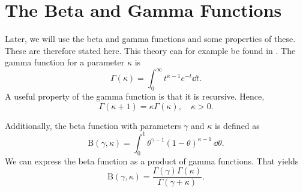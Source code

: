 \section{The Beta and Gamma Functions}


Later, we will use the beta and gamma functions and some properties of these. These are therefore stated here. This theory can for example be found in \citet{statinf}. The gamma function for a parameter $\kappa$ is 
\begin{equation*}
    \label{gamma_func}
    \Gamma(\kappa) = \int_0^\infty t^{\kappa-1}e^{-t} \dd t.
\end{equation*}
A useful property of the gamma function is that it is recursive. Hence,
\begin{equation}
\label{gamma_recursive_property}
    \Gamma(\kappa+1) = \kappa \Gamma(\kappa), \quad \kappa>0 .
\end{equation}

Additionally, the beta function with parameters $\gamma$ and $\kappa$ is defined as
\begin{equation*}
    \mathrm{B}(\gamma,\kappa) = \int_0^1 \theta^{\gamma-1}(1-\theta)^{\kappa-1} \: \dd \theta.
\end{equation*}
We can express the beta function as a product of gamma functions. That yields
\begin{equation}
\label{beta_as_gamma}
    \mathrm{B}(\gamma,\kappa) = \frac{\Gamma(\gamma)\Gamma(\kappa)}{\Gamma(\gamma+\kappa)}.
\end{equation}



